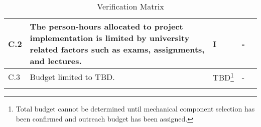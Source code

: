 \begin{longtable}[]{|m{}| m{} |m{} |m{}|m{}|}
C.2  & The person-hours allocated to project implementation is limited by university related factors such as exams, assignments, and lectures.                                 &      I        & -            &        \\ \hline
C.3  & Budget limited to TBD.                                                                                                                                                  &      TBD\footnote{Total budget cannot be determined until mechanical component selection has been confirmed and outreach budget has been assigned.}        & -            &        \\ \hline

\caption{Verification Matrix}
\label{tab:var-mat}
\end{longtable}
\raggedbottom
